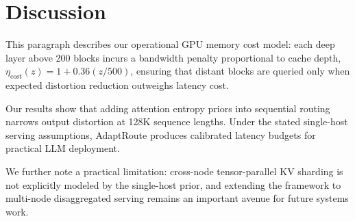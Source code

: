 \documentclass[11pt]{article}
\begin{document}
\section{Discussion}
\label{sec:discussion}

This paragraph describes our operational GPU memory cost model: each deep layer above 200 blocks incurs a bandwidth penalty proportional to cache depth, $\eta_{\text{cost}}(z) = 1 + 0.36 (z / 500)$, ensuring that distant blocks are queried only when expected distortion reduction outweighs latency cost.

Our results show that adding attention entropy priors into sequential routing narrows output distortion at 128K sequence lengths. Under the stated single-host serving assumptions, AdaptRoute produces calibrated latency budgets for practical LLM deployment.

We further note a practical limitation: cross-node tensor-parallel KV sharding is not explicitly modeled by the single-host prior, and extending the framework to multi-node disaggregated serving remains an important avenue for future systems work.
\end{document}
